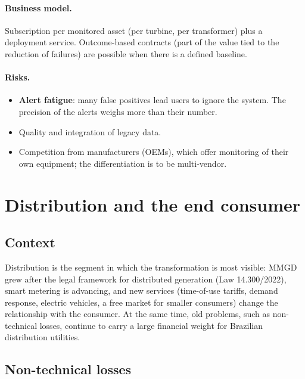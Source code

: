 \documentclass[10pt,a4paper,oneside]{article}
\begin{document}
\paragraph{Business model.}
Subscription per monitored asset (per turbine, per transformer) plus a
deployment service. Outcome-based contracts (part of the value tied to the
reduction of failures) are possible when there is a defined baseline.

\paragraph{Risks.}
\begin{itemize}
  \item \textbf{Alert fatigue}: many false positives lead users to ignore
    the system. The precision of the alerts weighs more than their number.
  \item Quality and integration of legacy data.
  \item Competition from manufacturers (OEMs), which offer monitoring of
    their own equipment; the differentiation is to be multi-vendor.
\end{itemize}

\section{Distribution and the end consumer}

\subsection{Context}

Distribution is the segment in which the transformation is most visible:
MMGD grew after the legal framework for distributed generation (Law
14.300/2022), smart metering is advancing, and new services (time-of-use
tariffs, demand response, electric vehicles, a free market for smaller
consumers) change the relationship with the consumer. At the same time, old
problems, such as non-technical losses, continue to carry a large financial
weight for Brazilian distribution utilities.

\subsection{Non-technical losses}
\end{document}
